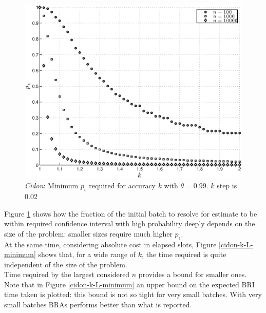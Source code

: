 \documentclass[12pt,a4paper]{report}
\newcommand{\pc}{p_{\epsilon}}
\begin{document}
\begin{figure}[htbp]
\begin{center}
\includegraphics[scale=0.7]{matlab/Cidon/cidon-k-p-minimum}
\caption[\emph{Cidon}: Minimum $\pc$ required for accuracy $k$]{\emph{Cidon}: Minimum $\pc$ required for accuracy $k$ with $\theta=0.99$. $k$ step is 0.02}
\label{cidon-k-p-minimum}
\end{center}
\end{figure}

Figure \ref{cidon-k-p-minimum} shows how the fraction of the initial batch to resolve for estimate to be within  required confidence interval with high probability deeply depends on the size of the problem: smaller sizes require much higher $\pc$.\\
At the same time, considering absolute cost in elapsed slots, Figure  \ref{cidon-k-L-minimum} shows that, for a wide range of $k$, the time required is quite independent of the size of the problem.\\
Time required by the largest considered $n$ provides a  bound for smaller ones.\\
Note that in Figure  \ref{cidon-k-L-minimum} an upper bound on the expected BRI time taken is plotted: this bound is not so tight for very small batches. With very small batches BRAs performs better than what is reported.   
\end{document}
